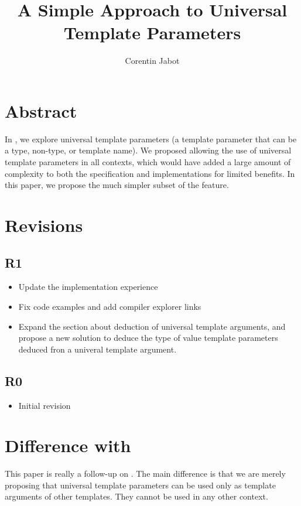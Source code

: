 \documentclass{wg21}
\title{A Simple Approach to Universal Template Parameters}
\author{Corentin Jabot}{corentin.jabot@gmail.com}
\begin{document}
\maketitle

\section{Abstract}
In , we explore universal template parameters (a template parameter that can be a type, non-type, or template name).
We proposed allowing the use of universal template parameters in all contexts, which would have added a large amount of complexity to both the specification and implementations
for limited benefits. In this paper, we propose the much simpler subset of the feature.


\section{Revisions}

\subsection{R1}

\begin{itemize}
    \item Update the implementation experience
    \item Fix code examples and add compiler explorer links
    \item Expand the section about deduction of universal template arguments, and propose a new solution to deduce the type of value template parameters deduced fron a univeral template argument.
\end{itemize}

\subsection{R0}

\begin{itemize}
    \item{Initial revision}
\end{itemize}


\section{Difference with }

This paper is really a follow-up on .
The main difference is that we are merely proposing that universal template parameters can be used only as template arguments of other templates.
They cannot be used in any other context.
\end{document}
